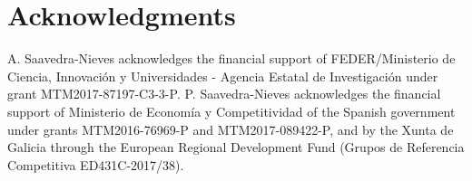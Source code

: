 \section{Acknowledgments}
	A. Saavedra-Nieves acknowledges the financial support of FEDER/Ministerio de Ciencia, Innovaci\'on y Universidades - Agencia Estatal de Investigaci\'on under grant MTM2017-87197-C3-3-P. P. Saavedra-Nieves acknowledges the financial support of Ministerio de Eco\-nom{\'i}a y Competitividad of the Spanish government under grants MTM2016-76969-P and MTM2017-089422-P, and by the Xunta de Galicia through the European Regional Development Fund (Grupos de Referencia Competitiva ED431C-2017/38).\\







\address{Alejandro Saavedra-Nieves\\
Departamento de Estatística, Análise Matemática e Optimización\\
Universidade de Santiago de Compostela\\
  Spain\\
  ORCID: 0000-0003-1251-6525\\
  }

\address{Paula Saavedra-Nieves\\
	Departamento de Estatística, Análise Matemática e Optimización\\
	Universidade de Santiago de Compostela\\
	Spain\\
	  ORCID: 0000-0002-3224-8858\\
	}
